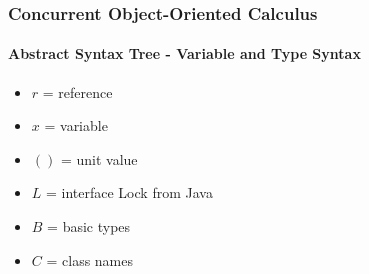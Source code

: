\begin{frame}
\frametitle{Concurrent Object-Oriented Calculus}
\framesubtitle{Abstract Syntax Tree - Variable and Type Syntax}
\begin{center}
  \begin{minipage}{0.5\linewidth}
    \hfill
\begin{itemize}
    \item $r$ = reference
    \item $x$ = variable
    \item $()$ = unit value
\end{itemize}
\end{minipage}
\end{center}

\begin{minipage}{0.8\linewidth}
    \hfill
\begin{itemize}
    \item $L$ = interface Lock from Java
    \item $B$ = basic types
    \item $C$ = class names
\end{itemize}
\end{minipage}
\end{frame}
